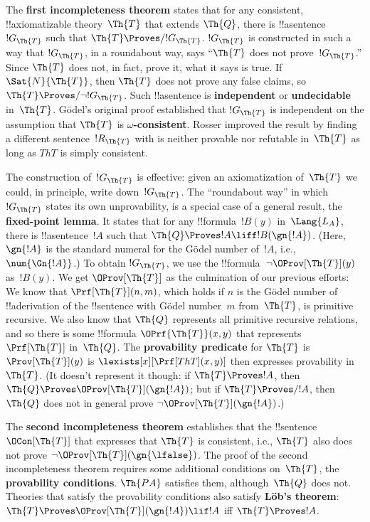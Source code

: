 The \textbf{first incompleteness theorem} states that for any
consistent, !!{axiomatizable} theory~$\Th{T}$ that extends $\Th{Q}$,
there is !!a{sentence}~$!G_\Th{T}$ such that $\Th{T} \Proves/
!G_\Th{T}$. $!G_\Th{T}$ is constructed in such a way that $!G_\Th{T}$,
in a roundabout way, says ``$\Th{T}$ does not prove~$!G_\Th{T}$.''
Since $\Th{T}$ does not, in fact, prove it, what it says is true. If
$\Sat{N}{\Th{T}}$, then $\Th{T}$ does not prove any false claims, so
$\Th{T} \Proves/ \lnot !G_\Th{T}$. Such !!a{sentence} is
\textbf{independent} or \textbf{undecidable} in~$\Th{T}$.  G\"odel's
original proof established that $!G_\Th{T}$ is independent on the
assumption that $\Th{T}$ is \textbf{$\omega$-consistent}. Rosser
improved the result by finding a different sentence~$!R_\Th{T}$ with
is neither provable nor refutable in~$\Th{T}$ as long as $Th{T}$ is
simply consistent.

The construction of~$!G_\Th{T}$ is effective: given an axiomatization
of~$\Th{T}$ we could, in principle, write down~$!G_\Th{T}$. The
``roundabout way'' in which $!G_\Th{T}$ states its own unprovability,
is a special case of a general result, the \textbf{fixed-point
  lemma}. It states that for any !!{formula}~$!B(y)$ in~$\Lang{L_A}$,
there is !!a{sentence}~$!A$ such that $\Th{Q} \Proves !A \liff
!B(\gn{!A})$. (Here, $\gn{!A}$ is the standard numeral for the G\"odel
number of~$!A$, i.e., $\num{\Gn{!A}}$.)  To obtain $!G_\Th{T}$, we use
the !!{formula}~$\lnot\OProv[\Th{T}](y)$ as~$!B(y)$.  We get
$\OProv[\Th{T}]$ as the culmination of our previous efforts: We know
that $\Prf[\Th{T}](n, m)$, which holds if $n$ is the G\"odel number of
!!a{derivation} of the !!{sentence} with G\"odel number~$m$
from~$\Th{T}$, is primitive recursive. We also know that $\Th{Q}$
represents all primitive recursive relations, and so there is some
!!{formula} $\OPrf{\Th{T}}(x,y)$ that represents~$\Prf[\Th{T}]$
in~$\Th{Q}$.  The \textbf{provability predicate} for $\Th{T}$ is
$\Prov[\Th{T}](y)$ is $\lexists[x][\Prf[Th{T}](x, y)]$ then expresses
provability in~$\Th{T}$. (It doesn't represent it though: if $\Th{T}
\Proves !A$, then $\Th{Q} \Proves \OProv[\Th{T}](\gn{!A})$; but if
$\Th{T} \Proves/ !A$, then $\Th{Q}$ does not in general prove $\lnot
\OProv[\Th{T}](\gn{!A})$.)

The \textbf{second incompleteness theorem} establishes that the
!!{sentence}~$\OCon[\Th{T}]$ that expresses that $\Th{T}$ is
consistent, i.e., $\Th{T}$ also does not prove
$\lnot \OProv[\Th{T}](\gn{\lfalse})$.  The proof of the second
incompleteness theorem requires some additional conditions
on~$\Th{T}$, the
\textbf{provability conditions}. $\Th{PA}$ satisfies them,
although~$\Th{Q}$ does not.  Theories that satisfy the provability
conditions also satisfy \textbf{L\"ob's theorem}: $\Th{T} \Proves
\OProv[\Th{T}](\gn{!A}) \lif !A$ iff $\Th{T} \Proves !A$.

